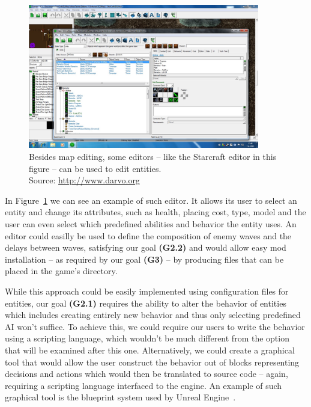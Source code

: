\begin{figure}[H]
    \centering
    \includegraphics[width=0.9\textwidth]{../img/sc_editor.jpg}
    \caption{Besides map editing, some editors -- like the Starcraft editor in this figure -- can be used to edit entities.
             \\Source: \href{http://www.darvo.org/images/Tutorials\%20Starcraft\%202/Adding\%20Units\%20to\%20a\%20Building\%20part\%201.jpg}
             {http://www.darvo.org}}
    \label{sc-editor}
\end{figure}

In Figure~\ref{sc-editor} we can see an example of such editor.
It allows its user to select an entity and change its attributes, such as health, placing cost, type, model and the user can even 
select which predefined abilities and behavior the entity uses. An editor could easilly be used to define the composition of enemy
waves and the delays between waves, satisfying our goal \textbf{(G2.2)} and would allow easy mod installation -- as required by our goal
\textbf{(G3)} -- by producing files that can be placed in the game's directory.

While this approach could be easily implemented using configuration files for entities, our goal \textbf{(G2.1)} requires the ability
to alter the behavior of entities which includes creating entirely new behavior and thus only selecting predefined AI won't suffice.
To achieve this, we could require our users to write the behavior using a scripting language, which wouldn't be much different
from the option that will be examined after this one. Alternatively, we could create a graphical tool that would allow the user
construct the behavior out of blocks
representing decisions and actions which would then be translated to source code -- again, requiring a scripting language interfaced
to the engine. An example of such graphical tool is the blueprint system used by Unreal Engine~\cite{UE}.

